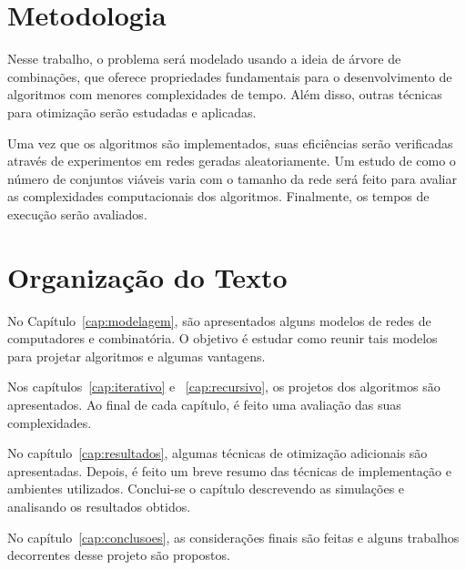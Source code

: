 \section{Metodologia}

Nesse trabalho, o problema será modelado usando a ideia de árvore de combinações, que oferece propriedades fundamentais para o desenvolvimento de algoritmos com menores complexidades de tempo. Além disso, outras técnicas para otimização serão estudadas e aplicadas.

Uma vez que os algoritmos são implementados, suas eficiências serão verificadas através de experimentos em redes geradas aleatoriamente. Um estudo de como o número de conjuntos viáveis varia com o tamanho da rede será feito para avaliar as complexidades computacionais dos algoritmos. Finalmente, os tempos de execução serão avaliados.

\section{Organização do Texto}

No Capítulo~\ref{cap:modelagem}, são apresentados alguns modelos de redes de computadores e combinatória. O objetivo é estudar como reunir tais modelos para projetar algoritmos e algumas vantagens. 

Nos capítulos~\ref{cap:iterativo} e ~\ref{cap:recursivo}, os projetos dos algoritmos são apresentados. Ao final de cada capítulo, é feito uma avaliação das suas complexidades.

No capítulo~\ref{cap:resultados}, algumas técnicas de otimização adicionais são apresentadas. Depois, é feito um breve resumo das técnicas de implementação e ambientes utilizados. Conclui-se o capítulo descrevendo as simulações e analisando os resultados obtidos.

No capítulo~\ref{cap:conclusoes}, as considerações finais são feitas e alguns trabalhos decorrentes desse projeto são propostos.

